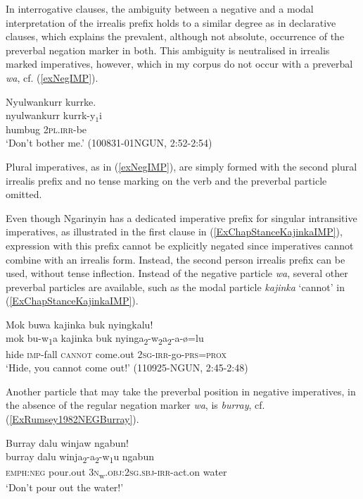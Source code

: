 \documentclass[output=paper,colorlinks,citecolor=brown]{langscibook}
\begin{document}
In interrogative clauses, the ambiguity between a negative and a modal interpretation of the irrealis prefix holds to a similar degree as in declarative clauses, which explains the prevalent, although not absolute, occurrence of the preverbal negation marker in both. This ambiguity is neutralised in irrealis marked imperatives, however, which in my corpus do not occur with a preverbal \textit{wa}, cf. (\ref{exNegIMP}).

\begin{exe}
\ex \label{exNegIMP}
\glll Nyulwankurr kurrke.\\
nyulwankurr kurrk-y$_1$i\\
humbug 2\textsc{pl}.\textsc{irr}-be\\
\trans `Don't bother me.' (100831-01NGUN, 2:52-2:54)
\end{exe}

Plural imperatives, as in (\ref{exNegIMP}), are simply formed with the second plural irrealis prefix and no tense marking on the verb and the preverbal particle omitted.

Even though Ngarinyin has a dedicated imperative prefix for singular intransitive imperatives, as illustrated in the first clause in (\ref{ExChapStanceKajinkaIMP}), expression with this prefix cannot be explicitly negated since imperatives cannot combine with an irrealis form. Instead, the second person irrealis prefix can be used, without tense inflection. Instead of the negative particle \textit{wa}, several other preverbal particles are available, such as the modal particle \textit{kajinka} `cannot' in (\ref{ExChapStanceKajinkaIMP}).

\begin{exe}
\ex \label{ExChapStanceKajinkaIMP}
\glll Mok buwa kajinka buk nyingkalu!\\
mok bu-w\textsubscript{1}a kajinka buk nyinga\textsubscript{2}-w\textsubscript{2}a\textsubscript{2}-a-{\o}=lu\\
hide \textsc{imp}-fall \textsc{cannot} come.out 2\textsc{sg}-\textsc{irr}-go-\textsc{prs}=\textsc{prox}\\
\trans `Hide, you cannot come out!' (110925-NGUN, 2:45-2:48)
\end{exe}

Another particle that may take the preverbal position in negative imperatives, in the absence of the regular negation marker \textit{wa}, is \textit{burray}, cf. (\ref{ExRumsey1982NEGBurray}).

\begin{exe}
\ex \label{ExRumsey1982NEGBurray}
\glll Burray dalu winjaw ngabun!\\
burray dalu winja\textsubscript{2}-a\textsubscript{2}-w\textsubscript{1}u ngabun\\
\textsc{emph:neg} pour.out 3\textsc{n}\textsubscript{w}.\textsc{obj:2sg.sbj-irr}-act.on water\\
\trans `Don't pour out the water!' \citep[168]{Rumsey1982}
\end{exe}
\end{document}
